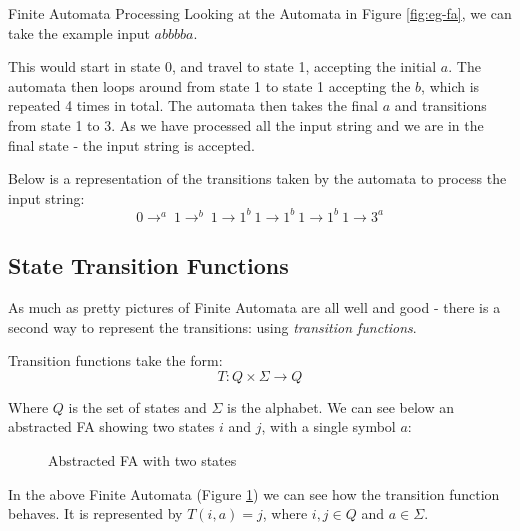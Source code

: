 \begin{example}{Finite Automata Processing}
Looking at the Automata in Figure \ref{fig:eg-fa}, we can take the example input $abbbba$.

This would start in state 0, and travel to state 1, accepting the initial $a$. The automata then loops around from state 1 to state 1 accepting the $b$, which is repeated 4 times in total. The automata then takes the final $a$ and transitions from state 1 to 3. As we have processed all the input string and we are in the final state - the input string is accepted.

Below is a representation of the transitions taken by the automata to process the input string:
\[0 \rightarrow ^a\ 1 \rightarrow ^b\ 1 \rightarrow 1 ^b\ 1 \rightarrow 1 ^b\ 1 \rightarrow 1 ^b\ 1 \rightarrow 3 ^a\]
\end{example}


\subsection{State Transition Functions}
As much as pretty pictures of Finite Automata are all well and good - there is a second way to represent the transitions: using \textit{transition functions}.

Transition functions take the form:
\[T : Q \times \Sigma \rightarrow Q\]

Where $Q$ is the set of states and $\Sigma$ is the alphabet. We can see below an abstracted FA showing two states $i$ and $j$, with a single symbol $a$:

\begin{figure}[H]
    \centering
    \caption{Abstracted FA with two states}
    \label{fig:fa-simple}
\end{figure}

In the above Finite Automata (Figure \ref{fig:fa-simple}) we can see how the transition function behaves. It is represented by $T(i, a) = j$, where $i, j \in Q$ and $a \in \Sigma$. 


